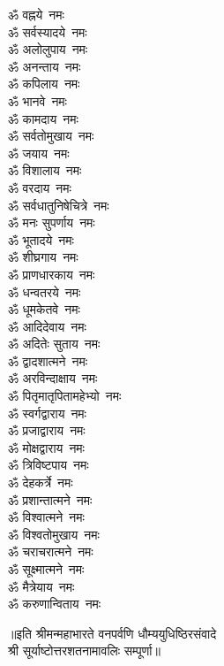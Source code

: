 \begin{multicols}{2}
\begin{flushleft}
        ॐ वह्नये~नमः\\
        ॐ सर्वस्यादये~नमः\\
        ॐ अलोलुपाय~नमः\\
        ॐ अनन्ताय~नमः\\
        ॐ कपिलाय~नमः\hfill{}\\
        ॐ भानवे~नमः\\
        ॐ कामदाय~नमः\\
        ॐ सर्वतोमुखाय~नमः\\
        ॐ जयाय~नमः\\
        ॐ विशालाय~नमः\\
        ॐ वरदाय~नमः\\
        ॐ सर्वधातुनिषेचित्रे~नमः\\
        ॐ मनः सुपर्णाय~नमः\\
        ॐ भूतादये~नमः\\
        ॐ शीघ्रगाय~नमः\hfill{}\\
        ॐ प्राणधारकाय~नमः\\
        ॐ धन्वतरये~नमः\\
        ॐ धूमकेतवे~नमः\\
        ॐ आदिदेवाय~नमः\\
        ॐ अदितेः सुताय~नमः\\
        ॐ द्वादशात्मने~नमः\\
        ॐ अरविन्दाक्षाय~नमः\\
        ॐ पितृमातृपितामहेभ्यो~नमः\\
        ॐ स्वर्गद्वाराय~नमः\\
        ॐ प्रजाद्वाराय~नमः\hfill{}\\
        ॐ मोक्षद्वाराय~नमः\\
        ॐ त्रिविष्टपाय~नमः\\
        ॐ देहकर्त्रे~नमः\\
        ॐ प्रशान्तात्मने~नमः\\
        ॐ विश्वात्मने~नमः\\
        ॐ विश्वतोमुखाय~नमः\\
        ॐ चराचरात्मने~नमः\\
        ॐ सूक्ष्मात्मने~नमः\\
        ॐ मैत्रेयाय~नमः\\
        ॐ करुणान्विताय~नमः\hfill{}\\
    \end{flushleft}
\end{multicols}
॥इति श्रीमन्महाभारते वनपर्वणि धौम्ययुधिष्ठिरसंवादे\\श्री सूर्याष्टोत्तरशतनामावलिः सम्पूर्णा॥
